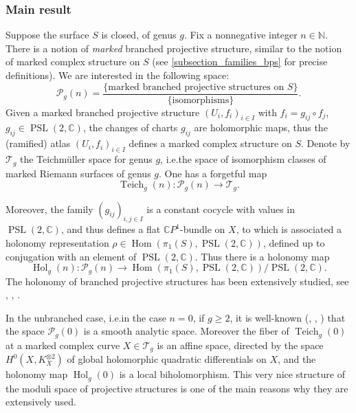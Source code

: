 \documentclass[10pt]{amsart}
\newcommand{\ie}{i.e.}
\newcommand{\C}{\mathbb C}
\newcommand{\N}{\mathbb N}
\newcommand{\CP}{\mathbb CP}
\DeclareMathOperator{\Hol}{Hol}
\DeclareMathOperator{\Hom}{Hom}
\DeclareMathOperator{\PSL}{PSL}
\DeclareMathOperator{\Teich}{Teich}
\theoremstyle{definition}
\theoremstyle{plain}
\begin{document}
\subsubsection*{Main result}

Suppose the surface $S$ is closed, of genus $g$.
Fix a nonnegative integer $n \in \N$.
There is a notion of \emph{marked} branched projective structure, similar to the notion of marked complex structure on $S$ (see \ref{subsection_families_bps} for precise definitions).
We are interested in the following space:
\begin{equation*}
\mathcal P_g(n) = \frac{\{\text{marked branched projective structures on $S$}\}}{\{\text{isomorphisms}\}}.
\end{equation*}
Given a marked branched projective structure $(U_i, f_i)_{i \in I}$ with $f_i = g_{ij} \circ f_j$, $g_{ij} \in \PSL(2, \C)$, the changes of charts $g_{ij}$ are holomorphic maps, thus the (ramified) atlas $(U_i, f_i)_{i \in I}$ defines a marked complex structure on $S$.
Denote by $\mathcal T_g$ the Teichmüller space for genus $g$, \ie the space of isomorphism classes of marked Riemann surfaces of genus $g$.
One has a forgetful map
\begin{equation*}
\Teich_g(n): \mathcal P_g(n) \to \mathcal T_g.
\end{equation*}

Moreover, the family $\left(g_{ij}\right)_{i, j \in I}$ is a constant cocycle with values in $\PSL(2, \C)$, and thus defines a flat $\CP^1$-bundle on $X$, to which is associated a holonomy representation $\rho \in \Hom(\pi_1(S), \PSL(2, \C))$, defined up to conjugation with an element of $\PSL(2, \C)$.
Thus there is a holonomy map
\begin{equation*}
\Hol_g(n): \mathcal P_g(n) \to \Hom(\pi_1(S), \PSL(2, \C)) / \PSL(2, \C).
\end{equation*}
The holonomy of branched projective structures has been extensively studied, see \cite{gallo-kapovich-marden}, \cite{calsamiglia-deroin-francaviglia}, \cite{le_fils}.

In the unbranched case, \ie in the case $n=0$, if $g \ge 2$, it is well-known (\cite{gunning}, \cite{hejhal}, \cite{hubbard}) that the space $\mathcal P_g(0)$ is a smooth analytic space.
Moreover the fiber of $\Teich_g(0)$ at a marked complex curve $X \in \mathcal T_g$ is an affine space, directed by the space $H^0\left(X, K_X^{\otimes 2}\right)$ of global holomorphic quadratic differentials on $X$, and the holonomy map $\Hol_g(0)$ is a local biholomorphism.
This very nice structure of the moduli space of projective structures is one of the main reasons why they are extensively used.
\end{document}
